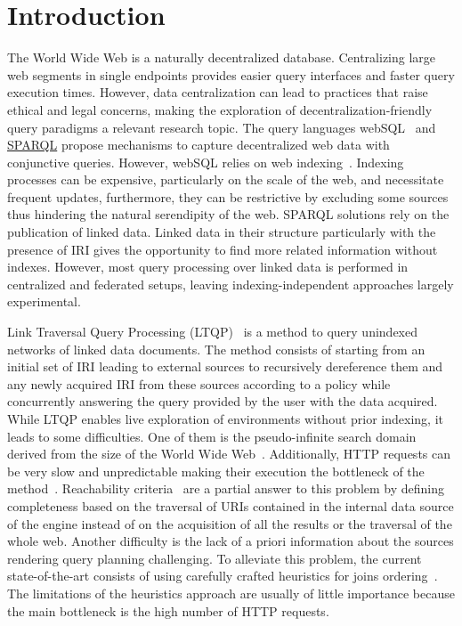 \section{Introduction}


The World Wide Web is a naturally decentralized database.
Centralizing large web segments in single endpoints provides easier query interfaces and faster query execution times.
However, data centralization can lead to practices that raise ethical and legal concerns, making the exploration of decentralization-friendly query paradigms a relevant research topic.
The query languages webSQL~\cite{Mendelzon1996} and \href{https://www.w3.org/TR/sparql11-query/}{SPARQL} propose mechanisms to capture decentralized web data with conjunctive queries.
However, webSQL relies on web indexing~\cite{Mendelzon1996}.
Indexing processes can be expensive, particularly on the scale of the web, and necessitate frequent updates, furthermore, they can be restrictive by excluding some sources thus hindering the natural serendipity of the web.
SPARQL solutions rely on the publication of linked data.
Linked data in their structure particularly with the presence of IRI gives the opportunity to find more related information without indexes.
However, most query processing over linked data is performed in centralized and federated setups, leaving indexing-independent approaches largely experimental.

Link Traversal Query Processing (LTQP)~\cite{Hartig2012} is a method to query unindexed networks of linked data documents.
The method consists of starting from an initial set of IRI leading to external sources to recursively dereference them and any newly acquired IRI from these sources according to a policy while concurrently answering the query provided by the user with the data acquired.
While LTQP enables live exploration of environments without prior indexing, it leads to some difficulties.
One of them is the pseudo-infinite search domain derived from the size of the World Wide Web~\cite{hartig2016walking}.
Additionally, HTTP requests can be very slow and unpredictable making their execution the bottleneck of the method~\cite{hartig2016walking}.
Reachability criteria~\cite{Hartig2012} are a partial answer to this problem by defining completeness based on the traversal of URIs
contained in the internal data source of the engine instead of on the acquisition of all the results or the traversal of the whole web.
Another difficulty is the lack of a priori information about the sources rendering query planning challenging.
To alleviate this problem, the current state-of-the-art consists of using carefully crafted heuristics for joins ordering~\cite{Hartig2011}.
The limitations of the heuristics approach are usually of little importance because the main bottleneck is the high number of HTTP requests.

